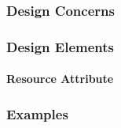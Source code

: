 \documentclass[letterpaper,10pt,titlepage,draftclsnofoot,onecolumn,onesided] {IEEEtran}
\begin{document}
\subsubsection{Design Concerns}
\subsubsection{Design Elements}
\paragraph{Resource Attribute}
\subsubsection{Examples}




%
%
\end{document}
